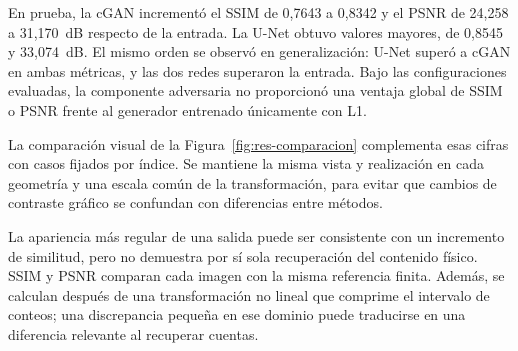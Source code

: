 En prueba, la cGAN incrementó el SSIM de 0,7643 a 0,8342 y el PSNR de 24,258 a 31,170~dB respecto de la entrada. La U-Net obtuvo valores mayores, de 0,8545 y 33,074~dB. El mismo orden se observó en generalización: U-Net superó a cGAN en ambas métricas, y las dos redes superaron la entrada. Bajo las configuraciones evaluadas, la componente adversaria no proporcionó una ventaja global de SSIM o PSNR frente al generador entrenado únicamente con L1.

La comparación visual de la Figura~\ref{fig:res-comparacion} complementa esas cifras con casos fijados por índice. Se mantiene la misma vista y realización en cada geometría y una escala común de la transformación, para evitar que cambios de contraste gráfico se confundan con diferencias entre métodos.

La apariencia más regular de una salida puede ser consistente con un incremento de similitud, pero no demuestra por sí sola recuperación del contenido físico. SSIM y PSNR comparan cada imagen con la misma referencia finita. Además, se calculan después de una transformación no lineal que comprime el intervalo de conteos; una discrepancia pequeña en ese dominio puede traducirse en una diferencia relevante al recuperar cuentas.

